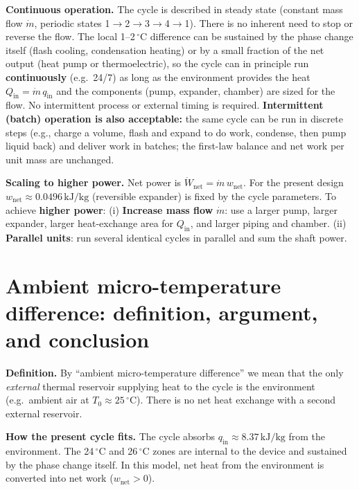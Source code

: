 \documentclass[11pt,a4paper]{article}
\begin{document}
\textbf{Continuous operation.} The cycle is described in steady state (constant
mass flow $\dot{m}$, periodic states 1$\to$2$\to$3$\to$4$\to$1). There is no
inherent need to stop or reverse the flow. The local 1--2\,$^\circ$C difference
can be sustained by the phase change itself (flash cooling, condensation
heating) or by a small fraction of the net output (heat pump or thermoelectric),
so the cycle can in principle run \textbf{continuously} (e.g.\ 24/7) as long as
the environment provides the heat $Q_{\mathrm{in}} = \dot{m}\,q_{\mathrm{in}}$
and the components (pump, expander, chamber) are sized for the flow. No
intermittent process or external timing is required. \textbf{Intermittent
(batch) operation is also acceptable:} the same cycle can be run in discrete
steps (e.g., charge a volume, flash and expand to do work, condense, then pump 
liquid back) and deliver work in batches; the first-law balance and net work 
per unit mass are unchanged.

\textbf{Scaling to higher power.} Net power is $\dot{W}_{\mathrm{net}} =
\dot{m}\,w_{\mathrm{net}}$. For the present design $w_{\mathrm{net}} \approx
0.0496\,\mathrm{kJ}/\mathrm{kg}$ (reversible expander) is fixed by the cycle parameters. To achieve
\textbf{higher power}: (i) \textbf{Increase mass flow} $\dot{m}$: use a larger
pump, larger expander, larger heat-exchange area for $Q_{\mathrm{in}}$, and
larger piping and chamber. (ii) \textbf{Parallel units}: run several identical 
cycles in parallel and sum the shaft power.

\section{Ambient micro-temperature difference: definition, argument, and conclusion}
\label{sec:ambient_delta_t}

\textbf{Definition.} By ``ambient micro-temperature difference'' we mean that 
the only \emph{external}
thermal reservoir supplying heat to the cycle is the environment (e.g.\
ambient air at $T_0 \approx 25\,^\circ\mathrm{C}$). There is no net heat 
exchange with a second external reservoir.

\textbf{How the present cycle fits.} The cycle absorbs $q_{\mathrm{in}} \approx
8.37\,\mathrm{kJ}/\mathrm{kg}$ from the environment.
The 24\,$^\circ$C and 26\,$^\circ$C zones are internal to the device and 
sustained by the phase change itself. In this model, net heat from the 
environment is converted into net work ($w_{\mathrm{net}} > 0$).
\end{document}
